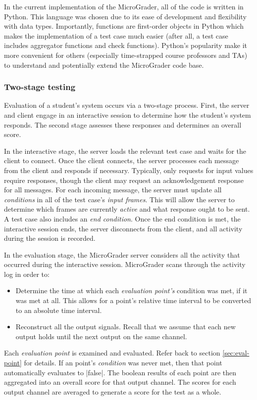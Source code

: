 \documentclass[12pt]{article}
\begin{document}
In the current implementation of the MicroGrader, all of the code is written in Python.  This language was chosen due to its ease of development and flexibility with data types.  Importantly, functions are first-order objects in Python which makes the implementation of a test case much easier (after all, a test case includes aggregator functions and check functions).  Python's popularity make it more convenient for others (especially time-strapped course professors and TAs) to understand and potentially extend the MicroGrader code base.

\subsubsection{Two-stage testing}
Evaluation of a student's system occurs via a two-stage process.  First, the server and client engage in an interactive session to determine how the student's system responds.  The second stage assesses these responses and determines an overall score.

In the interactive stage, the server loads the relevant test case and waits for the client to connect.  Once the client connects, the server processes each message from the client and responds if necessary.  Typically, only requests for input values require responses, though the client may request an acknowledgement response for all messages.  For each incoming message, the server must update all \textit{conditions} in all of the test case's \textit{input frames}.  This will allow the server to determine which frames are currently \textit{active} and what response ought to be sent.  A test case also includes an \textit{end condition}.  Once the end condition is met, the interactive session ends, the server disconnects from the client, and all activity during the session is recorded.

In the evaluation stage, the MicroGrader server considers all the activity that occurred during the interactive session.  MicroGrader scans through the activity log in order to:

\begin{itemize}
\item Determine the time at which each \textit{evaluation point's} condition was met, if it was met at all.  This allows for a point's relative time interval to be converted to an absolute time interval.
\item Reconstruct all the output signals.  Recall that we assume that each new output holds until the next output on the same channel.
\end{itemize}
Each \textit{evaluation point} is examined and evaluated.  Refer back to section \ref{sec:eval-point} for details.  If an point's \textit{condition} was never met, then that point automatically evaluates to |false|.  The boolean results of each point are then aggregated into an overall score for that output channel.  The scores for each output channel are averaged to generate a score for the test as a whole.
\end{document}
